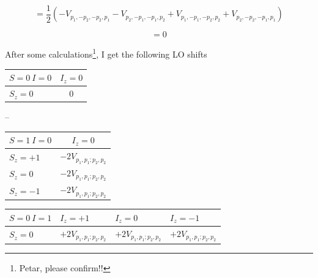 \documentclass[
  letterpaper,
  DIV=11,
  numbers=noendperiod]{scrartcl}
\newcounter{none} %
\begin{document}
\begin{equation}
=\frac{1}{2}\left(-V_{p_1,-p_2,-p_2,p_1}-V_{p_2,-p_1,-p_1,p_2}+V_{p_1,-p_1,-p_2,p_2}+V_{p_2,-p_2,-p_1,p_1}\right)
\end{equation}

\begin{equation}
=0
\end{equation}

After some calculations\footnote{Petar, please confirm!!}, I get the
following LO shifts

{\def\LTcaptype{none} %
\begin{longtable}[]{@{}lc@{}}
\toprule\noalign{}
\(S=0\  I=0\) & \(I_z=0\) \\
\midrule\noalign{}
\endhead
\bottomrule\noalign{}
\endlastfoot
\(S_z=0\) & \(0\) \\
\end{longtable}
}

--

{\def\LTcaptype{none} %
\begin{longtable}[]{@{}lc@{}}
\toprule\noalign{}
\(S=1\  I=0\) & \(I_z=0\) \\
\midrule\noalign{}
\endhead
\bottomrule\noalign{}
\endlastfoot
\(S_z=+1\) & \(-2V_{p_1,p_1;p_2,p_2}\) \\
\(S_z=0\) & \(-2V_{p_1,p_1;p_2,p_2}\) \\
\(S_z=-1\) & \(-2V_{p_1,p_1;p_2,p_2}\) \\
\end{longtable}
}

{\def\LTcaptype{none} %
\begin{longtable}[]{@{}
  >{\raggedright\arraybackslash}p{}
  >{\centering\arraybackslash}p{}
  >{\centering\arraybackslash}p{}
  >{\centering\arraybackslash}p{}@{}}
\toprule\noalign{}
\begin{minipage}[b]{\linewidth}\raggedright
\(S=0\  I=1\)
\end{minipage} & \begin{minipage}[b]{\linewidth}\centering
\(I_z=+1\)
\end{minipage} & \begin{minipage}[b]{\linewidth}\centering
\(I_z=0\)
\end{minipage} & \begin{minipage}[b]{\linewidth}\centering
\(I_z=-1\)
\end{minipage} \\
\midrule\noalign{}
\endhead
\bottomrule\noalign{}
\endlastfoot
\(S_z=0\) & \(+2V_{p_1,p_1;p_2,p_2}\) & \(+2V_{p_1,p_1;p_2,p_2}\) &
\(+2V_{p_1,p_1;p_2,p_2}\) \\
\end{longtable}
}
\end{document}
